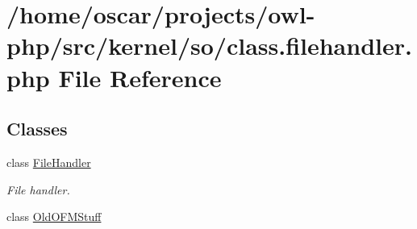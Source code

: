 \section{/home/oscar/projects/owl-\/php/src/kernel/so/class.filehandler.php File Reference}
\label{class_8filehandler_8php}
\subsection*{Classes}
\begin{DoxyCompactItemize}
\item 
class \hyperlink{classFileHandler}{FileHandler}
\begin{DoxyCompactList}\small\item\em File handler. \item\end{DoxyCompactList}\item 
class \hyperlink{classOldOFMStuff}{OldOFMStuff}
\end{DoxyCompactItemize}
